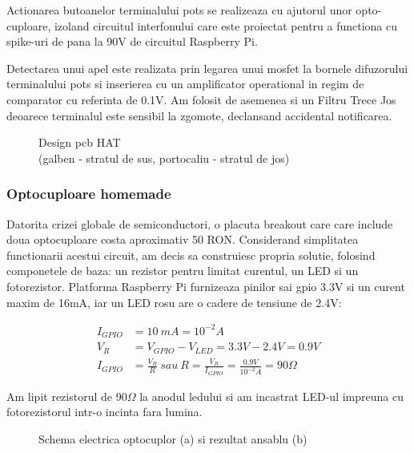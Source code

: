 Actionarea butoanelor terminalului \acrshort{pots} se realizeaza cu ajutorul unor opto-cuploare, izoland circuitul interfonului care este proiectat pentru a functiona cu spike-uri de pana la 90V de circuitul Raspberry Pi.

Detectarea unui apel este realizata prin legarea unui \acrfull{mosfet} la bornele difuzorului terminalului \acrshort{pots} si inserierea cu un amplificator operational in regim de comparator cu referinta de 0.1V. Am folosit de asemenea si un Filtru Trece Jos deoarece terminalul este sensibil la zgomote, declansand accidental notificarea.

\begin{figure}[h!]
  \centering
  \caption{Design \acrshort{pcb} HAT \\(galben - stratul de sus, portocaliu - stratul de jos)}
\end{figure}

\subsubsection {Optocuploare homemade}

Datorita crizei globale de semiconductori, o placuta breakout care care include doua optocuploare costa aproximativ 50 RON. Considerand simplitatea functionarii acestui circuit, am decis sa construiesc propria solutie, folosind componetele de baza: un rezistor pentru limitat curentul, un LED si un fotorezistor. Platforma Raspberry Pi furnizeaza pinilor sai \acrshort{gpio} 3.3V si un curent maxim de 16mA, iar un LED rosu are o cadere de tensiune de 2.4V:

\begin{equation}
\label{eq:test}
\begin{split}
I_{GPIO} & =10\ mA=10^{-2} A\\
V_{R} & =V_{GPIO} -V_{LED} =3.3V-2.4V=0.9V\\
I_{GPIO} & =\frac{V_{R}}{R} \ sau\ R=\frac{V_{R}}{I_{GPIO}} =\frac{0.9V}{10^{-2}A} =90\Omega
\end{split}
\end{equation}

Am lipit rezistorul de 90$\Omega$ la anodul ledului si am incastrat LED-ul impreuna cu fotorezistorul intr-o incinta fara lumina.

\begin{figure}[!ht]
\begin{center}
  \caption{Schema electrica optocuplor (a) si rezultat ansablu (b)}
  \label{fig:opto}
\end{center}
\end{figure}


